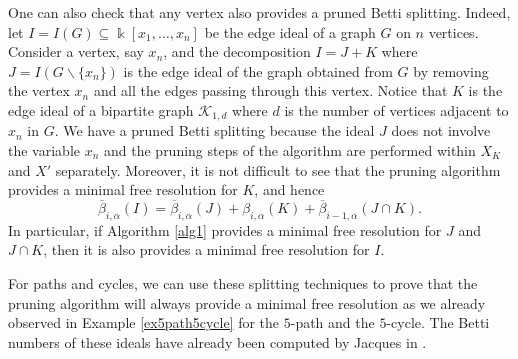 \documentclass[12pt]{amsart}
\theoremstyle{definition}
\theoremstyle{remark}
\numberwithin{equation}{section}
\newcommand\kk{\Bbbk}
\begin{document}
\vskip 2mm
One can also check that any vertex also
provides a pruned Betti splitting.
Indeed, let $I=I(G)\subseteq \kk[x_1,\dots,x_n]$ be the edge ideal of a
graph $G$ on $n$ vertices. Consider a vertex, say $x_n$, and the
decomposition $I=J+K$ where $J=I(G\backslash \{x_n\})$ is the edge
ideal of the graph obtained from $G$ by removing
the vertex $x_n$ and all the edges passing through this vertex. Notice that  $K$ is the edge ideal of a bipartite graph
$\mathcal{K}_{1,d}$ where $d$ is the number of vertices adjacent to $x_n$ in $G$. We
have a pruned Betti splitting because the ideal $J$ does not involve
the variable $x_n$ and the pruning steps of the algorithm are
performed within  $X_{K}$ and $X'$ separately. Moreover, it
is not difficult to see that the pruning algorithm provides a minimal
free resolution for $K$, and hence
$$\overline{\beta}_{i,\alpha}(I)= \overline{\beta}_{i,\alpha}(J)+{\beta}_{i,\alpha}(K)+\overline{\beta}_{i-1,\alpha}(J\cap
K).$$
In particular, if Algorithm \ref{alg1} provides a minimal free
resolution for $J$ and $J\cap K$, then it is also provides a minimal free resolution for $I$.

\vskip 2mm


For paths and cycles, we can use these splitting
techniques to prove that the pruning algorithm will always provide a minimal
free resolution as we already observed in Example \ref{ex5path5cycle} for the $5$-path and the $5$-cycle.
The Betti numbers of these ideals have already
been computed by Jacques in \cite{Jac04}. %

\vskip 2mm
\end{document}
